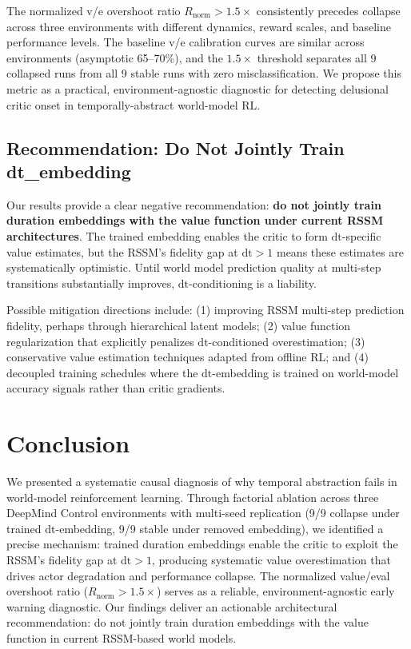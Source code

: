 \documentclass[10pt,letterpaper]{article}
\begin{document}
The normalized v/e overshoot ratio $R_{\text{norm}} > 1.5\times$ consistently precedes collapse across three environments with different dynamics, reward scales, and baseline performance levels. The baseline v/e calibration curves are similar across environments (asymptotic 65--70\%), and the $1.5\times$ threshold separates all 9 collapsed runs from all 9 stable runs with zero misclassification. We propose this metric as a practical, environment-agnostic diagnostic for detecting delusional critic onset in temporally-abstract world-model RL.

\subsection{Recommendation: Do Not Jointly Train dt\_embedding}

Our results provide a clear negative recommendation: \textbf{do not jointly train duration embeddings with the value function under current RSSM architectures}. The trained embedding enables the critic to form $\mathrm{dt}$-specific value estimates, but the RSSM's fidelity gap at $\mathrm{dt}{>}1$ means these estimates are systematically optimistic. Until world model prediction quality at multi-step transitions substantially improves, $\mathrm{dt}$-conditioning is a liability.

Possible mitigation directions include: (1) improving RSSM multi-step prediction fidelity, perhaps through hierarchical latent models; (2) value function regularization that explicitly penalizes $\mathrm{dt}$-conditioned overestimation; (3) conservative value estimation techniques adapted from offline RL; and (4) decoupled training schedules where the $\mathrm{dt}$-embedding is trained on world-model accuracy signals rather than critic gradients.


\section{Conclusion}
\label{sec:conclusion}

We presented a systematic causal diagnosis of why temporal abstraction fails in world-model reinforcement learning. Through factorial ablation across three DeepMind Control environments with multi-seed replication (9/9 collapse under trained $\mathrm{dt}$-embedding, 9/9 stable under removed embedding), we identified a precise mechanism: trained duration embeddings enable the critic to exploit the RSSM's fidelity gap at $\mathrm{dt}{>}1$, producing systematic value overestimation that drives actor degradation and performance collapse. The normalized value/eval overshoot ratio ($R_{\text{norm}} > 1.5\times$) serves as a reliable, environment-agnostic early warning diagnostic. Our findings deliver an actionable architectural recommendation: do not jointly train duration embeddings with the value function in current RSSM-based world models.
\end{document}
